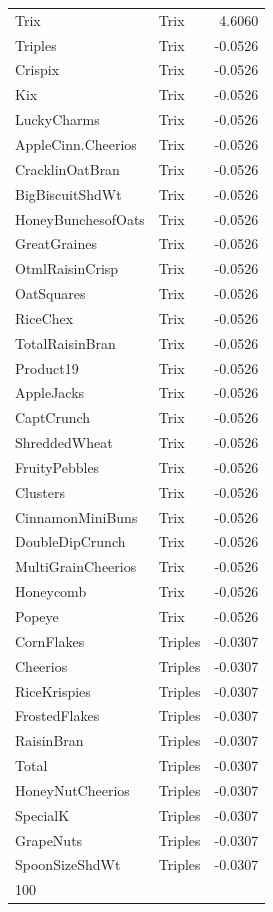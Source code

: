 \begin{longtable}{llr}
Trix & Trix & 4.6060 \\
Triples & Trix & -0.0526 \\
Crispix & Trix & -0.0526 \\
Kix & Trix & -0.0526 \\
LuckyCharms & Trix & -0.0526 \\
AppleCinn.Cheerios & Trix & -0.0526 \\
CracklinOatBran & Trix & -0.0526 \\
BigBiscuitShdWt & Trix & -0.0526 \\
HoneyBunchesofOats & Trix & -0.0526 \\
GreatGraines & Trix & -0.0526 \\
OtmlRaisinCrisp & Trix & -0.0526 \\
OatSquares & Trix & -0.0526 \\
RiceChex & Trix & -0.0526 \\
TotalRaisinBran & Trix & -0.0526 \\
Product19 & Trix & -0.0526 \\
AppleJacks & Trix & -0.0526 \\
CaptCrunch & Trix & -0.0526 \\
ShreddedWheat & Trix & -0.0526 \\
FruityPebbles & Trix & -0.0526 \\
Clusters & Trix & -0.0526 \\
CinnamonMiniBuns & Trix & -0.0526 \\
DoubleDipCrunch & Trix & -0.0526 \\
MultiGrainCheerios & Trix & -0.0526 \\
Honeycomb & Trix & -0.0526 \\
Popeye & Trix & -0.0526 \\
CornFlakes & Triples & -0.0307 \\
Cheerios & Triples & -0.0307 \\
RiceKrispies & Triples & -0.0307 \\
FrostedFlakes & Triples & -0.0307 \\
RaisinBran & Triples & -0.0307 \\
Total & Triples & -0.0307 \\
HoneyNutCheerios & Triples & -0.0307 \\
SpecialK & Triples & -0.0307 \\
GrapeNuts & Triples & -0.0307 \\
SpoonSizeShdWt & Triples & -0.0307 \\
100%

\end{longtable}
